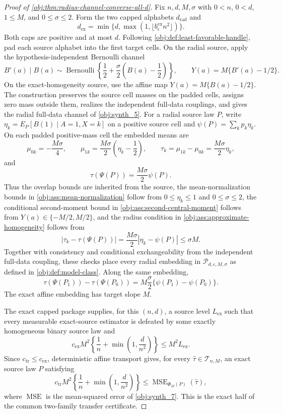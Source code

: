 \documentclass[11pt]{article}
\begin{document}
\begin{proof}[Proof of \cref{obj:thm:radius-channel-converse-all-d}]
Fix \(n,d,M,\sigma\) with \(0<n\), \(0<d\), \(1\le M\), and \(0\le\sigma\le2\).  Form the two capped alphabets \(d_{\mathrm{rad}}\) and
\[
d_{\mathrm{ex}}
=
\min\{d,\max(1,\lfloor b_{\epsilon}^{\mathrm{ex}}n^2\rfloor)\}.
\]
Both caps are positive and at most \(d\).  Following \cref{obj:def:least-favorable-handle}, pad each source alphabet into the first target cells.  On the radial source, apply the hypothesis-independent Bernoulli channel
\[
B'(a)\mid B(a)
\sim
\operatorname{Bernoulli}\!\left\{\frac12+\frac{\sigma}{2}\left(B(a)-\frac12\right)\right\},
\qquad
Y(a)=M\{B'(a)-1/2\}.
\]
On the exact-homogeneity source, use the affine map \(Y(a)=M\{B(a)-1/2\}\).  The construction preserves the source cell masses on the padded cells, assigns zero mass outside them, realizes the independent full-data couplings, and gives the radial full-data channel of \cref{obj:synth_5}.  For a radial source law \(P\), write \(\eta_k=E_P[B(1)\mid A=1,X=k]\) on a positive source cell and \(\psi(P)=\sum_k p_k\eta_k\).  On each padded positive-mass cell the embedded means are
\[
\mu_{0k}=-\frac{M\sigma}{4},
\qquad
\mu_{1k}=\frac{M\sigma}{2}\left(\eta_k-\frac12\right),
\qquad
\tau_k=\mu_{1k}-\mu_{0k}=\frac{M\sigma}{2}\eta_k,
\]
and
\[
\tau(\Psi(P))=\frac{M\sigma}{2}\psi(P).
\]
Thus the overlap bounds are inherited from the source, the mean-normalization bounds in \cref{obj:ass:mean-normalization} follow from \(0\le\eta_k\le1\) and \(0\le\sigma\le2\), the conditional second-moment bound in \cref{obj:ass:second-central-moment} follows from \(Y(a)\in\{-M/2,M/2\}\), and the radius condition in \cref{obj:ass:approximate-homogeneity} follows from
\[
|\tau_k-\tau(\Psi(P))|
=
\frac{M\sigma}{2}|\eta_k-\psi(P)|
\le \sigma M .
\]
Together with consistency and conditional exchangeability from the independent full-data coupling, these checks place every radial embedding in \(\mathcal P_{d,\epsilon,M,\sigma}\) as defined in \cref{obj:def:model-class}.  Along the same embedding,
\[
\tau(\Psi(P_1))-\tau(\Psi(P_0))
=
M\frac{\sigma}{2}\{\psi(P_1)-\psi(P_0)\}.
\]
The exact affine embedding has target slope \(M\). %

The exact capped package supplies, for this \((n,d)\), a source level \(L_{\mathrm{ex}}\) such that every measurable exact-source estimator is defeated by some exactly homogeneous binary source law and
\[
c_{\mathrm{ex}}M^2
\left\{\frac1n+\min\left(1,\frac d{n^2}\right)\right\}
\le
M^2L_{\mathrm{ex}} .
\]
Since \(c_{\mathrm{tr}}\le c_{\mathrm{ex}}\), deterministic affine transport gives, for every \(\widehat\tau\in\mathcal T_{n,M}\), an exact source law \(P\) satisfying
\[
c_{\mathrm{tr}}M^2
\left\{\frac1n+\min\left(1,\frac d{n^2}\right)\right\}
\le
\operatorname{MSE}_{\Phi_M(P)}(\widehat\tau),
\]
where \(\operatorname{MSE}\) is the mean-squared error of \cref{obj:synth_7}.  This is the exact half of the common two-family transfer certificate. %


\end{proof}
\end{document}
